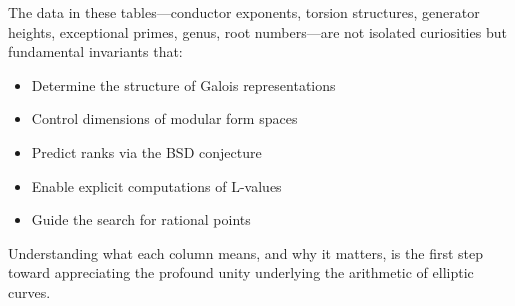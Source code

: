 \documentclass[11pt]{article}
\begin{document}
The data in these tables---conductor exponents, torsion structures, generator heights, exceptional primes, genus, root numbers---are not isolated curiosities but fundamental invariants that:
\begin{itemize}
\item Determine the structure of Galois representations
\item Control dimensions of modular form spaces
\item Predict ranks via the BSD conjecture
\item Enable explicit computations of L-values
\item Guide the search for rational points
\end{itemize}

Understanding what each column means, and why it matters, is the first step toward appreciating the profound unity underlying the arithmetic of elliptic curves.
\end{document}
